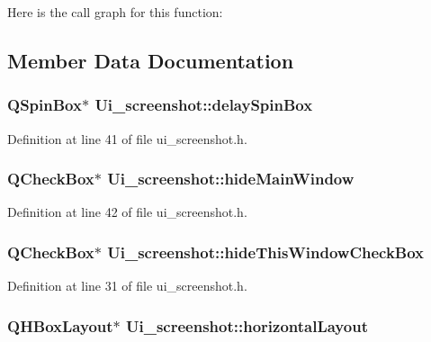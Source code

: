 Here is the call graph for this function:




\subsection{Member Data Documentation}
\hypertarget{classUi__screenshot_a37924d707077bd389b53ac026e132883}{
\subsubsection[{delaySpinBox}]{\setlength{\rightskip}{0pt plus 5cm}QSpinBox$\ast$ {\bf Ui\_\-screenshot::delaySpinBox}}}
\label{classUi__screenshot_a37924d707077bd389b53ac026e132883}


Definition at line 41 of file ui\_\-screenshot.h.

\hypertarget{classUi__screenshot_acbaa4ec23e0b6f51e1aac36432b3d142}{
\subsubsection[{hideMainWindow}]{\setlength{\rightskip}{0pt plus 5cm}QCheckBox$\ast$ {\bf Ui\_\-screenshot::hideMainWindow}}}
\label{classUi__screenshot_acbaa4ec23e0b6f51e1aac36432b3d142}


Definition at line 42 of file ui\_\-screenshot.h.

\hypertarget{classUi__screenshot_a302c64bae3d7e039369b7ff51a6cfd96}{
\subsubsection[{hideThisWindowCheckBox}]{\setlength{\rightskip}{0pt plus 5cm}QCheckBox$\ast$ {\bf Ui\_\-screenshot::hideThisWindowCheckBox}}}
\label{classUi__screenshot_a302c64bae3d7e039369b7ff51a6cfd96}


Definition at line 31 of file ui\_\-screenshot.h.

\hypertarget{classUi__screenshot_a6e891cbda23b216532845c5ca2b3edb3}{
\subsubsection[{horizontalLayout}]{\setlength{\rightskip}{0pt plus 5cm}QHBoxLayout$\ast$ {\bf Ui\_\-screenshot::horizontalLayout}}}
\label{classUi__screenshot_a6e891cbda23b216532845c5ca2b3edb3}


